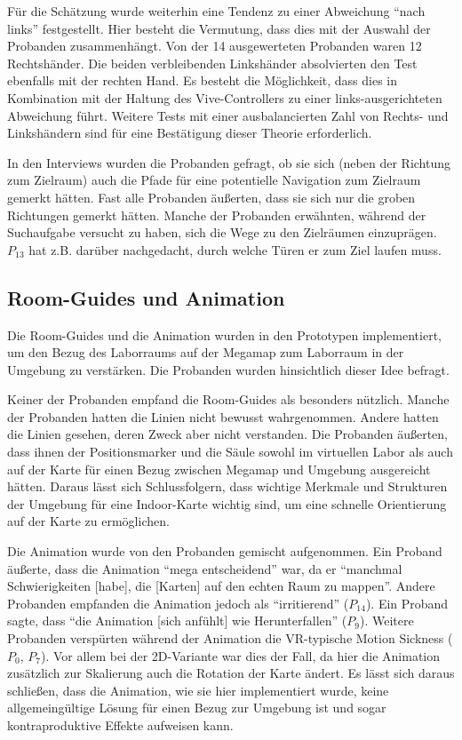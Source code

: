 Für die Schätzung wurde weiterhin eine Tendenz zu einer Abweichung \enquote{nach links} festgestellt.
Hier besteht die Vermutung, dass dies mit der Auswahl der Probanden zusammenhängt.
Von der 14 ausgewerteten Probanden waren 12 Rechtshänder.
Die beiden verbleibenden Linkshänder absolvierten den Test ebenfalls mit der rechten Hand.
Es besteht die Möglichkeit, dass dies in Kombination mit der Haltung des Vive-Controllers zu einer links-ausgerichteten Abweichung führt.
Weitere Tests mit einer ausbalancierten Zahl von Rechts- und Linkshändern sind für eine Bestätigung dieser Theorie erforderlich.

In den Interviews wurden die Probanden gefragt, ob sie sich (neben der Richtung zum Zielraum) auch die Pfade für eine potentielle Navigation zum Zielraum gemerkt hätten.
Fast alle Probanden äußerten, dass sie sich nur die groben Richtungen gemerkt hätten.
Manche der Probanden erwähnten, während der Suchaufgabe versucht zu haben, sich die Wege zu den Zielräumen einzuprägen.
$P_{13}$ hat z.B. darüber nachgedacht, durch welche Türen er zum Ziel laufen muss.

\subsection{Room-Guides und Animation}
Die Room-Guides und die Animation wurden in den Prototypen implementiert, um den Bezug des Laborraums auf der Megamap zum Laborraum in der Umgebung zu verstärken.
Die Probanden wurden hinsichtlich dieser Idee befragt.

Keiner der Probanden empfand die Room-Guides als besonders nützlich.
Manche der Probanden hatten die Linien nicht bewusst wahrgenommen.
Andere hatten die Linien gesehen, deren Zweck aber nicht verstanden.
Die Probanden äußerten, dass ihnen der Positionsmarker und die Säule sowohl im virtuellen Labor als auch auf der Karte für einen Bezug zwischen Megamap und Umgebung ausgereicht hätten.
Daraus lässt sich Schlussfolgern, dass wichtige Merkmale und Strukturen der Umgebung für eine Indoor-Karte wichtig sind, um eine schnelle Orientierung auf der Karte zu ermöglichen.

Die Animation wurde von den Probanden gemischt aufgenommen.
Ein Proband äußerte, dass die Animation \enquote{mega entscheidend} war, da er \enquote{manchmal Schwierigkeiten [habe], die [Karten] auf den echten Raum zu mappen}.
Andere Probanden empfanden die Animation jedoch als \enquote{irritierend} ($P_{14}$).
Ein Proband sagte, dass \enquote{die Animation [sich anfühlt] wie Herunterfallen} ($P_9$).
Weitere Probanden verspürten während der Animation die VR-typische Motion Sickness ($P_0$, $P_7$).
Vor allem bei der 2D-Variante war dies der Fall, da hier die Animation zusätzlich zur Skalierung auch die Rotation der Karte ändert.
Es lässt sich daraus schließen, dass die Animation, wie sie hier implementiert wurde, keine allgemeingültige Lösung für einen Bezug zur Umgebung ist und sogar kontraproduktive Effekte aufweisen kann.

